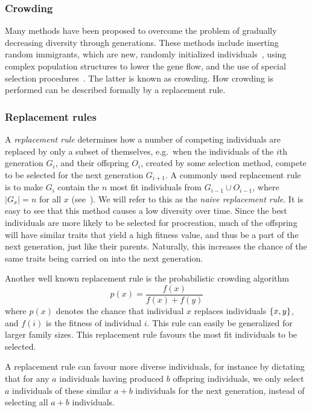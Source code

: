 \subsubsection{Crowding}
Many methods have been proposed to overcome the problem of gradually decreasing diversity through generations. These methods include inserting random immigrants, which are new, randomly initialized individuals~\cite{Cobb93geneticalgorithms}, using complex population structures to lower the gene flow, and the use of special selection procedures~\cite{ursem2002diversity}. The latter is known as crowding.  How crowding is performed can be described formally by a replacement rule.

\subsubsection{Replacement rules}
A \emph{replacement rule} determines how a number of competing individuals are replaced by only a subset of themselves, e.g.\ when the individuals of the $i$th generation $G_i$, and their offspring $O_i$, created by some selection method, compete to be selected for the next generation $G_{i+1}$. A commonly used replacement rule is to make $G_i$ contain the $n$ most fit individuals from $G_{i-1} \cup O_{i-1}$, where $\mid G_x\mid = n$ for all $x$ (see~\cite{masterThesisGANN}). We will refer to this as the \emph{naive replacement rule}. It is easy to see that this method causes a low diversity over time. Since the best individuals are more likely to be selected for procreation, much of the offspring will have similar traits that yield a high fitness value, and thus be a part of the next generation, just like their parents. Naturally, this increases the chance of the same traits being carried on into the next generation.

Another well known replacement rule is the probabilistic crowding algorithm~\cite{Mengshoel_and_Goldberg:1999}
%
\[
  p(x) = \frac{f\left(x\right)}{f\left(x\right)+f\left(y\right)}
\]
%
where $p(x)$ denotes the chance that individual $x$ replaces individuals $\left\{ x, y \right\}$, and $f(i)$ is the fitness of individual $i$. This rule can easily be generalized for larger family sizes. This replacement rule favours the most fit individuals to be selected.

A replacement rule can favour more diverse individuals, for instance by dictating that for any $a$ individuals having produced $b$ offspring individuals, we only select $a$ individuals of these similar $a + b$ individuals for the next generation, instead of selecting all $a + b$ individuals.


